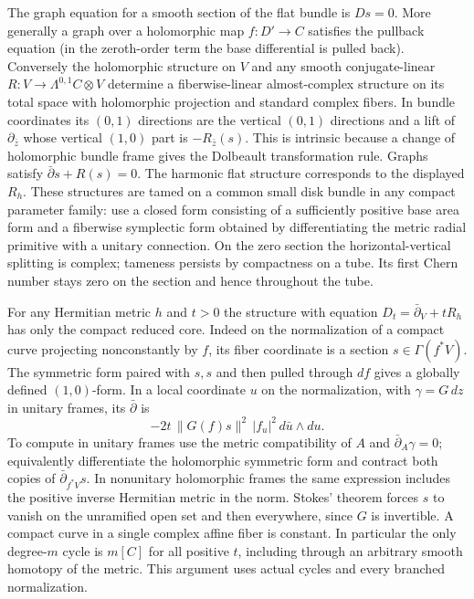 The graph equation for a smooth section of the flat bundle is \(Ds=0\). More generally a graph over a holomorphic map \(f:D'\to C\) satisfies the pullback equation (in the zeroth-order term the base differential is pulled back). Conversely the holomorphic structure on \(V\) and any smooth conjugate-linear \(R:V\to\Lambda^{0,1}C\otimes V\) determine a fiberwise-linear almost-complex structure on its total space with holomorphic projection and standard complex fibers. In bundle coordinates its \((0,1)\) directions are the vertical \((0,1)\) directions and a lift of \(\partial_{\bar z}\) whose vertical \((1,0)\) part is \(-R_{\bar z}(s)\). This is intrinsic because a change of holomorphic bundle frame gives the Dolbeault transformation rule. Graphs satisfy \(\bar\partial s+R(s)=0\). The harmonic flat structure corresponds to the displayed \(R_h\). These structures are tamed on a common small disk bundle in any compact parameter family: use a closed form consisting of a sufficiently positive base area form and a fiberwise symplectic form obtained by differentiating the metric radial primitive with a unitary connection. On the zero section the horizontal-vertical splitting is complex; tameness persists by compactness on a tube. Its first Chern number stays zero on the section and hence throughout the tube.

For any Hermitian metric \(h\) and \(t>0\) the structure with equation \(D_t=\bar\partial_V+tR_h\) has only the compact reduced core. Indeed on the normalization of a compact curve projecting nonconstantly by \(f\), its fiber coordinate is a section \(s\in\Gamma(f^*V)\). The symmetric form paired with \(s,s\) and then pulled through \(df\) gives a globally defined \((1,0)\)-form. In a local coordinate \(u\) on the normalization, with \(\gamma=G\,dz\) in unitary frames, its \(\bar\partial\) is
\[-2t\,\|G(f)s\|^2\, |f_u|^2\,d\bar u\wedge du .\]
To compute in unitary frames use the metric compatibility of \(A\) and \(\bar\partial_A\gamma=0\); equivalently differentiate the holomorphic symmetric form and contract both copies of \(\bar\partial_{f^*V}s\). In nonunitary holomorphic frames the same expression includes the positive inverse Hermitian metric in the norm. Stokes' theorem forces \(s\) to vanish on the unramified open set and then everywhere, since \(G\) is invertible. A compact curve in a single complex affine fiber is constant. In particular the only degree-\(m\) cycle is \(m[C]\) for all positive \(t\), including through an arbitrary smooth homotopy of the metric. This argument uses actual cycles and every branched normalization.

